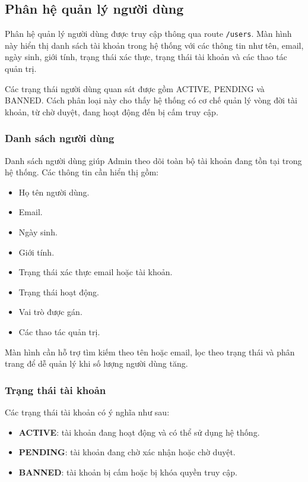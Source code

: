 \subsection{Phân hệ quản lý người dùng}

Phân hệ quản lý người dùng được truy cập thông qua route \texttt{/users}. Màn hình này hiển thị danh sách tài khoản trong hệ thống với các thông tin như tên, email, ngày sinh, giới tính, trạng thái xác thực, trạng thái tài khoản và các thao tác quản trị.

Các trạng thái người dùng quan sát được gồm ACTIVE, PENDING và BANNED. Cách phân loại này cho thấy hệ thống có cơ chế quản lý vòng đời tài khoản, từ chờ duyệt, đang hoạt động đến bị cấm truy cập.

\subsubsection{Danh sách người dùng}

Danh sách người dùng giúp Admin theo dõi toàn bộ tài khoản đang tồn tại trong hệ thống. Các thông tin cần hiển thị gồm:

\begin{itemize}
    \item Họ tên người dùng.
    \item Email.
    \item Ngày sinh.
    \item Giới tính.
    \item Trạng thái xác thực email hoặc tài khoản.
    \item Trạng thái hoạt động.
    \item Vai trò được gán.
    \item Các thao tác quản trị.
\end{itemize}

Màn hình cần hỗ trợ tìm kiếm theo tên hoặc email, lọc theo trạng thái và phân trang để dễ quản lý khi số lượng người dùng tăng.

\subsubsection{Trạng thái tài khoản}

Các trạng thái tài khoản có ý nghĩa như sau:

\begin{itemize}
    \item \textbf{ACTIVE}: tài khoản đang hoạt động và có thể sử dụng hệ thống.
    \item \textbf{PENDING}: tài khoản đang chờ xác nhận hoặc chờ duyệt.
    \item \textbf{BANNED}: tài khoản bị cấm hoặc bị khóa quyền truy cập.
\end{itemize}

